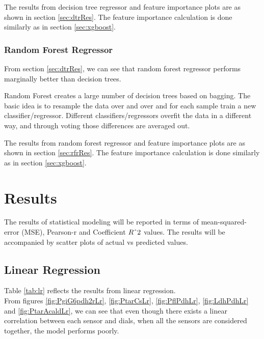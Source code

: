 \documentclass[12pt,chapterheads]{ucsd}
\begin{document}
The results from decision tree regressor and feature importance plots are as shown in section \ref{sec:dtrRes}. The feature importance calculation is done similarly as in section \ref{sec:xgboost}.


\subsection{Random Forest Regressor}
From section \ref{sec:dtrRes}, we can see that random forest regressor performs marginally better than decision trees.

Random Forest creates a large number of decision trees based on bagging. The basic idea is to resample the data over and over and for each sample train a new classifier/regressor. Different classifiers/regressors overfit the data in a different way, and through voting those differences are averaged out.

The results from random forest regressor and feature importance plots are as shown in section \ref{sec:rfrRes}. The feature importance calculation is done similarly as in section \ref{sec:xgboost}. 




\chapter{Results} \label{chap:results}
The results of statistical modeling will be reported in terms of mean-squared-error \string(MSE), Pearson-r and Coefficient $R\string^2$ values. The results will be accompanied by scatter plots of actual vs predicted values.

\section{Linear Regression} \label{sec:lr}
Table \ref{tab:lr} reflects the results from linear regression.\\
From figures \ref{fig:PgiG6pdh2rLr}, \ref{fig:PtarCsLr}, \ref{fig:PflPdhLr}, \ref{fig:LdhPdhLr} and \ref{fig:PtarAcaldLr}, we can see that even though there exists a linear correlation between each sensor and dials, when all the sensors are considered together, the model performs poorly. 
\end{document}

